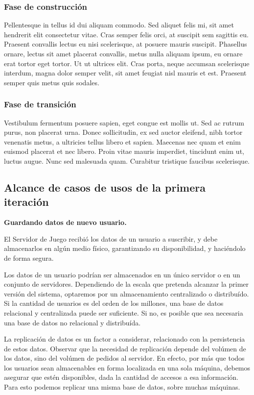 \documentclass[a4paper, 10pt, twoside]{article}
\begin{document}
\subsubsection{Fase de construcción}
Pellentesque in tellus id dui aliquam commodo. Sed aliquet felis mi, sit amet hendrerit elit consectetur vitae. Cras semper felis orci, at suscipit sem sagittis eu. Praesent convallis lectus eu nisi scelerisque, at posuere mauris suscipit. Phasellus ornare, lectus sit amet placerat convallis, metus nulla aliquam ipsum, eu ornare erat tortor eget tortor. Ut ut ultrices elit. Cras porta, neque accumsan scelerisque interdum, magna dolor semper velit, sit amet feugiat nisl mauris et est. Praesent semper quis metus quis sodales.

\subsubsection{Fase de transición}
Vestibulum fermentum posuere sapien, eget congue est mollis ut. Sed ac rutrum purus, non placerat urna. Donec sollicitudin, ex sed auctor eleifend, nibh tortor venenatis metus, a ultricies tellus libero et sapien. Maecenas nec quam et enim euismod placerat et nec libero. Proin vitae mauris imperdiet, tincidunt enim ut, luctus augue. Nunc sed malesuada quam. Curabitur tristique faucibus scelerisque.

\subsection{Alcance de casos de usos de la primera iteración}
\textbf{Guardando datos de nuevo usuario.}

El Servidor de Juego recibió los datos de un usuario a suscribir, y debe almacenarlos en algún medio físico, garantizando su disponibilidad, y haciéndolo de forma segura.

Los datos de un usuario podrían ser almacenados en un único servidor o en un conjunto de servidores. Dependiendo de la escala que pretenda alcanzar la primer versión del sistema, optaremos por un almacenamiento centralizado o distribuído. Si la cantidad de usuarios es del orden de los millones, una base de datos relacional y centralizada puede ser suficiente. Si no, es posible que sea necesaria una base de datos no relacional y distribuída.

La replicación de datos es un factor a considerar, relacionado con la persistencia de estos datos. Observar que la necesidad de replicación depende del volúmen de los datos, sino del volúmen de pedidos al servidor. En efecto, por más que todos los usuarios sean almacenables en forma localizada en una sola máquina, debemos asegurar que estén disponibles, dada la cantidad de accesos a esa información. Para esto podemos replicar una misma base de datos, sobre muchas máquinas.
\end{document}
